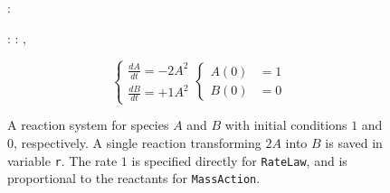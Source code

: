 \begin{figure}[t]
\begin{minipage}[t]{\linewidth}
{\begin{minipage}[c]{0.40\linewidth}
{}

\end{minipage}%

}

\end{minipage}%
\newline
\begin{minipage}[t]{\linewidth}

{\centering 

\begin{minipage}[c]{0.60\linewidth}

{\centering 

\begin{Shaded}
\begin{Highlighting}[]
:

: \OperatorTok{=}\KeywordTok{(}\OperatorTok{=}\KeywordTok{)}
: \OperatorTok{=}\KeywordTok{(}\OperatorTok{=}\KeywordTok{)}
\OperatorTok{=}\KeywordTok{(}
\OperatorTok{=}\KeywordTok{[} \OperatorTok{*}\KeywordTok{]},
\OperatorTok{=}\NormalTok{\KeywordTok{[}B\KeywordTok{]},}
\OperatorTok{=}\NormalTok{,}
\KeywordTok{    )}
\end{Highlighting}
\end{Shaded}

}

\end{minipage}%
%
\begin{minipage}[c]{0.40\linewidth}

{\centering 

\[
\begin{cases}
    \frac{dA}{dt} = -2 A^2 \\
    \frac{dB}{dt} = +1 A^2
\end{cases}
\begin{cases}
    A(0) &= 1 \\
    B(0) &= 0
\end{cases}
\]

}

\end{minipage}%

}

\end{minipage}%

\caption{\label{fig-simbio}A reaction system for species \(A\) and \(B\)
with initial conditions \(1\) and \(0\), respectively. A single reaction
transforming \(2A\) into \(B\) is saved in variable \texttt{r}. The rate
\(1\) is specified directly for \texttt{RateLaw}, and is proportional to
the reactants for \texttt{MassAction}.}

\end{figure}
